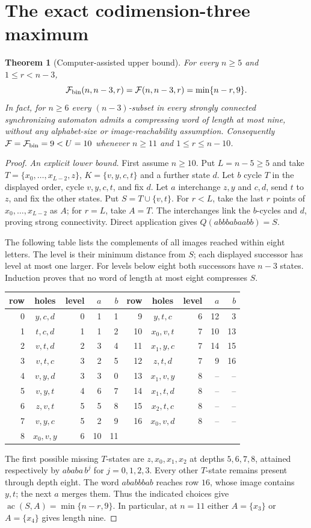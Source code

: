 \documentclass[10pt]{article}
\newtheorem{theorem}{Theorem}
\newcommand{\ac}{\operatorname{ac}}
\newcommand{\Max}{\mathcal F}
\begin{document}
\section{The exact codimension-three maximum}
\begin{theorem}[Computer-assisted upper bound]\label{thm:binary}
For every $n\ge5$ and $1\le r<n-3$,
\[
 \Max_{\rm bin}(n,n-3,r)=\Max(n,n-3,r)=\min\{n-r,9\}.
\]
In fact, for $n\ge6$ every $(n-3)$-subset in every strongly connected
synchronizing automaton admits a compressing word of length at most nine,
without any alphabet-size or image-reachability assumption.
Consequently $\Max=\Max_{\rm bin}=9<U=10$ whenever
$n\ge11$ and $1\le r\le n-10$.
\end{theorem}
\begin{proof}
\emph{An explicit lower bound.}
First assume $n\ge10$. Put $L=n-5\ge5$ and take $T=\{x_0,\ldots,x_{L-2},z\}$,
$K=\{v,y,c,t\}$ and a further state $d$.
Let $b$ cycle $T$ in the displayed order, cycle $v,y,c,t$, and fix $d$.
Let $a$ interchange $z,y$ and $c,d$, send $t$ to $z$, and fix the other states.
Put $S=T\cup\{v,t\}$. For $r<L$, take the last $r$ points of
$x_0,\ldots,x_{L-2}$ as $A$; for $r=L$, take $A=T$.
The interchanges link the $b$-cycles and $d$, proving strong connectivity.
Direct application gives $Q(abbbabaabb)=S$.

The following table lists the complements of all images reached within eight letters.
The level is their minimum distance from $S$; each displayed successor has level at most one larger.
For levels below eight both successors have $n-3$ states.
Induction proves that no word of length at most eight compresses $S$.
\begin{center}\small
\begin{tabular}{rcrrr@{\qquad}rcrrr}
row&holes&level&$a$&$b$&row&holes&level&$a$&$b$\\ \hline
0&$y,c,d$&0&1&1&9&$y,t,c$&6&12&3\\
1&$t,c,d$&1&1&2&10&$x_0,v,t$&7&10&13\\
2&$v,t,d$&2&3&4&11&$x_1,y,c$&7&14&15\\
3&$v,t,c$&3&2&5&12&$z,t,d$&7&9&16\\
4&$v,y,d$&3&3&0&13&$x_1,v,y$&8&--&--\\
5&$v,y,t$&4&6&7&14&$x_1,t,d$&8&--&--\\
6&$z,v,t$&5&5&8&15&$x_2,t,c$&8&--&--\\
7&$v,y,c$&5&2&9&16&$x_0,v,d$&8&--&--\\
8&$x_0,v,y$&6&10&11&&&&&
\end{tabular}
\end{center}
The first possible missing $T$-states are $z,x_0,x_1,x_2$ at depths
$5,6,7,8$, attained respectively by $ababa\,b^j$ for $j=0,1,2,3$.
Every other $T$-state remains present through depth eight.
The word $ababbbab$ reaches row $16$, whose image contains $y,t$; the next $a$ merges them.
Thus the indicated choices give $\ac(S,A)=\min\{n-r,9\}$.
In particular, at $n=11$ either $A=\{x_3\}$ or $A=\{x_4\}$ gives length nine.


\end{proof}
\end{document}

